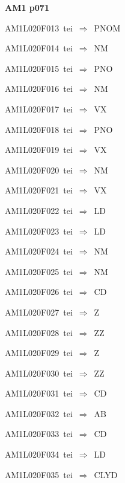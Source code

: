 \par\vfill\eject
{\bf\hfill AM1 p071\hfill\hbox{}}\par\bigskip
{\sixrm AM1L020F013\ {\sixit tei}\ }$\Rightarrow$\ PNOM\par\smallskip
{\sixrm AM1L020F014\ {\sixit tei}\ }$\Rightarrow$\ NM\par\smallskip
{\sixrm AM1L020F015\ {\sixit tei}\ }$\Rightarrow$\ PNO\par\smallskip
{\sixrm AM1L020F016\ {\sixit tei}\ }$\Rightarrow$\ NM\par\smallskip
{\sixrm AM1L020F017\ {\sixit tei}\ }$\Rightarrow$\ VX\par\smallskip
{\sixrm AM1L020F018\ {\sixit tei}\ }$\Rightarrow$\ PNO\par\smallskip
{\sixrm AM1L020F019\ {\sixit tei}\ }$\Rightarrow$\ VX\par\smallskip
{\sixrm AM1L020F020\ {\sixit tei}\ }$\Rightarrow$\ NM\par\smallskip
{\sixrm AM1L020F021\ {\sixit tei}\ }$\Rightarrow$\ VX\par\smallskip
{\sixrm AM1L020F022\ {\sixit tei}\ }$\Rightarrow$\ LD\par\smallskip
{\sixrm AM1L020F023\ {\sixit tei}\ }$\Rightarrow$\ LD\par\smallskip
{\sixrm AM1L020F024\ {\sixit tei}\ }$\Rightarrow$\ NM\par\smallskip
{\sixrm AM1L020F025\ {\sixit tei}\ }$\Rightarrow$\ NM\par\smallskip
{\sixrm AM1L020F026\ {\sixit tei}\ }$\Rightarrow$\ CD\par\smallskip
{\sixrm AM1L020F027\ {\sixit tei}\ }$\Rightarrow$\ Z\par\smallskip
{\sixrm AM1L020F028\ {\sixit tei}\ }$\Rightarrow$\ ZZ\par\smallskip
{\sixrm AM1L020F029\ {\sixit tei}\ }$\Rightarrow$\ Z\par\smallskip
{\sixrm AM1L020F030\ {\sixit tei}\ }$\Rightarrow$\ ZZ\par\smallskip
{\sixrm AM1L020F031\ {\sixit tei}\ }$\Rightarrow$\ CD\par\smallskip
{\sixrm AM1L020F032\ {\sixit tei}\ }$\Rightarrow$\ AB\par\smallskip
{\sixrm AM1L020F033\ {\sixit tei}\ }$\Rightarrow$\ CD\par\smallskip
{\sixrm AM1L020F034\ {\sixit tei}\ }$\Rightarrow$\ LD\par\smallskip
{\sixrm AM1L020F035\ {\sixit tei}\ }$\Rightarrow$\ CLYD\par\smallskip
